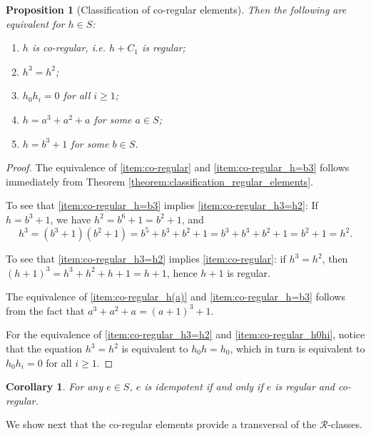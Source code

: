 \documentclass[a4paper, 11pt]{article}
\theoremstyle{plain}
\newtheorem{corollary}  [theorem]{Corollary}
\newtheorem{proposition}[theorem]{Proposition}
\theoremstyle{definition}
\begin{document}
\begin{proposition}[Classification of co-regular elements] \label{proposition:co-regular}
Then the following are equivalent for $h \in S$:
\begin{enumerate}
    \item \label{item:co-regular} $h$ is co-regular, i.e. $h + C_1$ is regular;

    \item \label{item:co-regular_h3=h2} $h^3 = h^2$;

    \item \label{item:co-regular_h0hi} $h_0 h_i = 0$ for all $i \ge 1$;

    \item \label{item:co-regular_h(a)} $h = a^3 + a^2 + a$ for some $a \in S$;

    \item \label{item:co-regular_h=b3} $h = b^3 + 1$ for some $b \in S$.
\end{enumerate}
\end{proposition}

\begin{proof}
The equivalence of \ref{item:co-regular} and \ref{item:co-regular_h=b3} follows immediately from Theorem \ref{theorem:classification_regular_elements}.

To see that \ref{item:co-regular_h=b3} implies \ref{item:co-regular_h3=h2}: If $h = b^3 + 1$, we have $h^2 = b^6 + 1 = b^2 + 1$, and 
\[
    h^3 = (b^3 + 1)(b^2 + 1) = b^5 + b^3 + b^2 + 1 = b^3 +b^3 +b^2 + 1 =b^2 + 1= h^2.
\]

To see that \ref{item:co-regular_h3=h2} implies \ref{item:co-regular}: if $h^3 = h^2$, then $(h+1)^3 = h^3 + h^2 + h + 1 = h + 1$, hence $h + 1$ is regular.

The equivalence of \ref{item:co-regular_h(a)} and \ref{item:co-regular_h=b3} follows from the fact that $a^3 + a^2 + a = (a+1)^3 + 1$.

For the equivalence of \ref{item:co-regular_h3=h2} and \ref{item:co-regular_h0hi}, notice that the equation $h^3 = h^2$ is equivalent to $h_0h = h_0$, which in turn is equivalent to $h_0 h_i = 0$ for all $i \ge 1$.
\end{proof}

\begin{corollary}
For any $e \in S$, $e$ is idempotent if and only if $e$ is regular and co-regular.
\end{corollary}

We show next that the co-regular elements provide a transversal of the $\mathcal{R}$-classes. 
\end{document}
